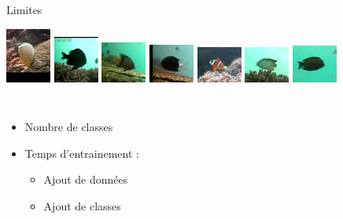 \documentclass[10pt,xcolor={x11names}]{beamer}
\begin{document}
\begin{frame}{Limites}
	\begin{center}
		\includegraphics[width=4em]{fishes/5.png}
		\includegraphics[width=4em]{fishes/1.png}
		\includegraphics[width=4em]{fishes/2.png}
		\includegraphics[width=4em]{fishes/3.png}
		\includegraphics[width=4em]{fishes/4.png}
		\includegraphics[width=4em]{fishes/6.png}
		\includegraphics[width=4em]{fishes/8.png}
	\end{center}

	\begin{columns}
		\begin{itemize}
			\item Nombre de classes
			\item Temps d'entrainement :
			\begin{itemize}
				\item Ajout de données
				\item Ajout de classes
			\end{itemize}
		\end{itemize}
	\end{columns}


\end{frame}
\end{document}
